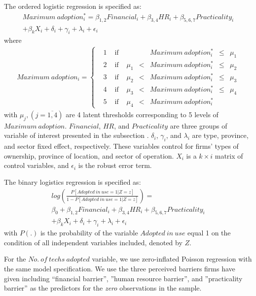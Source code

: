 \documentclass[a4paper,11pt]{article}
\begin{document}
The ordered logistic regression is specified as:
\begin{multline}
	Maximum \ adoption_i^* = \beta_{1,2} Financial_i + \beta_{3,4} HR_i + \beta_{5,6,7} Practicality_i \\
	+ \beta_k X_i + \delta_i + \gamma_i + \lambda_i + \epsilon_i
\end{multline}
where
\begin{align}	
	Maximum \ adoption_i = \left\{
	\begin{matrix}
		&1 &\mbox{ if } &      &  &Maximum \ adoption_i^* &\le &\mu_1 \\
		&2 &\mbox{ if } &\mu_1 &< &Maximum \ adoption_i^* &\le &\mu_2 \\
		&3 &\mbox{ if } &\mu_2 &< &Maximum \ adoption_i^* &\le &\mu_3 \\
		&4 &\mbox{ if } &\mu_3 &< &Maximum \ adoption_i^* &\le &\mu_4 \\
		&5 &\mbox{ if } &\mu_4 &< &Maximum \ adoption_i^* &    &
	\end{matrix}
	\right.
\end{align}
with $\mu_j, (j = \overline{1,4})$ are 4 latent thresholds corresponding to 5 levels of $Maximum \ adoption$. $Financial$, $HR$, and $Practicality$ are three groups of variable of interest presented in the subsection . $\delta_i$, $\gamma_i$, and $\lambda_i$ are type, province, and sector fixed effect, respectively. These variables control for firms' types of ownership, province of location, and sector of operation. $X_i$ is a $k \times i$ matrix of control variables, and $\epsilon_i$ is the robust error term.

The binary logistics regression is specified as:
\begin{multline}
	log\left( \frac{P[Adopted \ in \ use = 1|Z=z]}{1- P[Adopted \ in \ use = 1|Z=z]} \right) = \\ 
	\beta_0 + \beta_{1,2} Financial_i + \beta_{3,4} HR_i + \beta_{5,6,7} Practicality_i \\
	+ \beta_k X_i + \delta_i + \gamma_i + \lambda_i + \epsilon_i
\end{multline}
with $P(.)$ is the probability of the variable $Adopted \ in \ use$ equal 1 on the condition of all independent variables included, denoted by $Z$.

For the $No. \ of \ techs \ adopted$ variable, we use zero-inflated Poisson regression with the same model specification. We use the three perceived barriers firms have given including ``financial barrier'', ''human resource barrier'', and ''practicality barrier'' as the predictors for the \textit{zero} observations in the sample.
\end{document}
